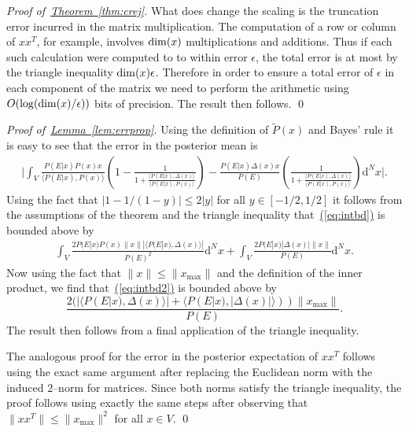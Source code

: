 \documentclass[twoside]{article}
\newenvironment{proofof}[1]{\begin{trivlist}\item[]{\flushleft\it
Proof of~#1.}}
{\qed\end{trivlist}}
\newcommand{\eq}[1]{\hyperref[eq:#1]{(\ref*{eq:#1})}}
\newcommand{\thm}[1]{\hyperref[thm:#1]{Theorem~\ref*{thm:#1}}}
\newcommand{\lem}[1]{\hyperref[lem:#1]{Lemma~\ref*{lem:#1}}}
\begin{document}
\begin{proofof}{\thm{crej}}
What does change the scaling is the truncation error incurred in the matrix multiplication.  The computation of a row or column of $xx^T$, for example, involves ${\rm dim}(x)$ multiplications and additions.  Thus if each such calculation were computed to to within error $\epsilon$, the total error is at most by the triangle inequality ${\rm dim}(x) \epsilon$.  Therefore in order to ensure a total error of $\epsilon$ in each component of the matrix we need to perform the arithmetic using $O(\log({\rm dim}(x)/\epsilon))$ bits of precision.  The result then follows.
\end{proofof}

\begin{proofof}{\lem{errprop}}
Using the definition of $\tilde{P}(x)$ and Bayes' rule it is easy to see that the error in the posterior mean is
\begin{align}
\Biggr| \int_V \frac{P(E|x)P(x)x}{\langle P(E|x),P(x) \rangle}\left( 1 - \frac{1}{1+\frac{\langle P(E|x),\Delta(x)\rangle }{\langle P(E|x),P(x) \rangle}}\right) - \frac{P(E|x) \Delta(x)x}{P(E)}\left(\frac{1}{1+\frac{\langle P(E|x),\Delta(x)\rangle }{\langle P(E|x),P(x) \rangle}} \right)\mathrm{d}^Nx \Biggr|.\label{eq:intbd}
\end{align}
Using the fact that $|1-1/(1-y)| \le 2|y|$ for all $y\in [-1/2,1/2]$ it follows from the assumptions of the theorem and the triangle inequality that~\eq{intbd} is bounded above by
\begin{align}
 \int_V \frac{2P(E|x)P(x)\|x\| |\langle P(E|x),\Delta(x) \rangle|}{P(E)^2}\mathrm{d}^Nx+ \int_V\frac{2P(E|x) |\Delta(x)|\|x\|}{P(E)}\mathrm{d}^Nx.\label{eq:intbd2}
\end{align}
Now using the fact that $\|x\|\le \|x_{\max}\|$ and the definition of the inner product, we find that~\eq{intbd2} is bounded above by
\begin{equation}
\frac{2 (|\langle P(E|x),\Delta(x) \rangle| + \langle P(E|x), |\Delta(x)| \rangle))\|x_{\max}\|}{P(E)}.
\end{equation}
The  result then follows from a final application of the triangle inequality.

The analogous proof for the error in the posterior expectation of $xx^T$ follows using the exact same argument after replacing the Euclidean norm with the induced $2$--norm for matrices.  Since both norms satisfy the triangle inequality, the proof follows using exactly the same steps after observing that $\|xx^T\|\le \|x_{\max}\|^2$ for all $x\in V$.
\end{proofof}
\end{document}
